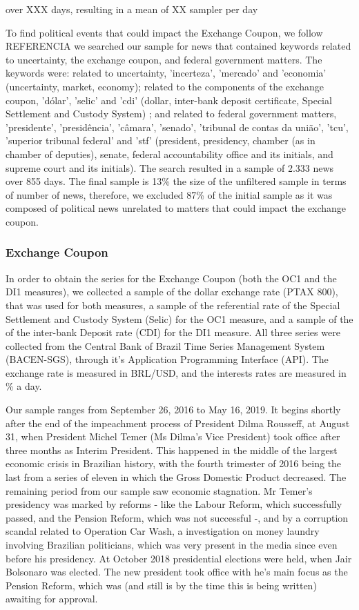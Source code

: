 \documentclass[cic,tc, english]{iiufrgs}
\begin{document}
    {over XXX days, resulting in a mean of XX sampler per day}

    To find political events that could impact the Exchange Coupon, {we follow REFERENCIA} we searched our sample for news that contained keywords related to uncertainty, the exchange coupon, and federal government matters. The keywords were: related to uncertainty, 'incerteza', 'mercado' and 'economia' (uncertainty, market, economy); related to the components of the exchange coupon, 'dólar', 'selic' and 'cdi' (dollar, inter-bank deposit certificate, Special Settlement and Custody System) ; and related to federal government matters, 'presidente', 'presidência', 'câmara', 'senado', 'tribunal de contas da união', 'tcu', 'superior tribunal federal' and 'stf' (president, presidency, chamber (as in chamber of deputies), senate, federal accountability office and its initials, and supreme court and its initials). The search resulted in a sample of 2.333 news over 855 days. The final sample is 13\% the size of the unfiltered sample in terms of number of news, therefore, we excluded 87\% of the initial sample as it was composed of political news unrelated to matters that could impact the exchange coupon.

\subsubsection{Exchange Coupon} \label{chapter_exchange_coupon}

    In order to obtain the series for the Exchange Coupon (both the OC1 and the DI1 measures), we collected a sample of the dollar exchange rate (PTAX 800), that was used for both measures, a sample of the referential rate of the Special Settlement and Custody System (Selic) for the OC1 measure, and a sample of the of the inter-bank Deposit rate (CDI) for the DI1 measure. All three series were collected from the Central Bank of Brazil Time Series Management System (BACEN-SGS), through it's Application Programming Interface (API). The exchange rate is measured in BRL/USD, and the interests rates are measured in \% a day.
    
    Our sample ranges from September 26, 2016 to May 16, 2019. It begins shortly after the end of the impeachment process of President Dilma Rousseff, at August 31, when President Michel Temer (Ms Dilma's Vice President) took office after three months as Interim President. This happened in the middle of the largest economic crisis in Brazilian history, with the fourth trimester of 2016 being the last from a series of eleven in which the Gross Domestic Product decreased. The remaining period from our sample saw economic stagnation. Mr Temer's presidency was marked by reforms - like the Labour Reform, which successfully passed, and the Pension Reform, which was not successful -, and by a corruption scandal related to Operation Car Wash, a investigation on money laundry involving Brazilian politicians, which was very present in the media since even before his presidency. At October 2018 presidential elections were held, when Jair Bolsonaro was elected. The new president took office with he's main focus as the Pension Reform, which was (and still is by the time this is being written) awaiting for approval.
    
\end{document}

